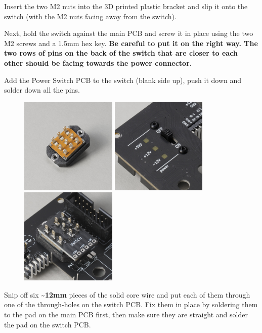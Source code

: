 \documentclass[12pt, a4paper]{article}
\begin{document}
Insert the two M2 nuts into the 3D printed plastic bracket and slip it onto the switch (with
the M2 nuts facing away from the switch).

Next, hold the switch against the main PCB and screw it in place using the two M2 screws and a
1.5mm hex key. \textbf{Be careful to put it on the right way. The two rows of pins on the back
of the switch that are closer to each other should be facing towards the power connector.}

Add the Power Switch PCB to the switch (blank side up), push it down and solder down all the
pins.

\begin{figure}[H]
    \centering
    \includegraphics[width=46mm]{images/31_01_switch_bracket_nuts.jpg}
    \hspace{2mm}
    \includegraphics[width=46mm]{images/31_02_switch_assembled.jpg}
    \hspace{2mm}
    \includegraphics[width=46mm]{images/31_03_switch_pcb_soldered.jpg}
\end{figure}

Snip off six \textbf{\textasciitilde12mm} pieces of the solid core wire and put each of them through
one of the through-holes on the switch PCB. Fix them in place by soldering them to the pad
on the main PCB first, then make sure they are straight and solder the pad on the switch PCB.
\end{document}
